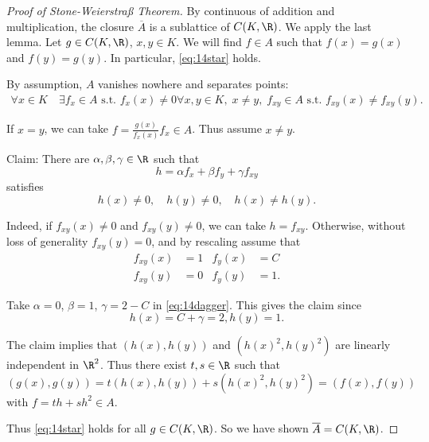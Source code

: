 \documentclass{article}
\begin{document}
\begin{proof}[Proof of Stone-Weierstra{\ss} Theorem]
    By continuous of addition and multiplication, the closure $\overline{A}$ is a sublattice of $C(K, \R)$.
    We apply the last lemma.
    Let $g \in C(K, \R)$, $x, y \in K$. We will find $f \in A$ such that $f(x) = g(x)$ and $f(y) = g(y)$.
    In particular, \eqref{eq:14star} holds.

    By assumption, $A$ vanishes nowhere and separates points:
    \begin{align*}
        \forall x \in K \quad \exists f_x \in A \text{ s.t. } f_x(x) \neq 0
        \forall x, y \in K, \; x \neq y, \; f_{xy} \in A \text{ s.t. } f_{xy}(x) \neq f_{xy}(y).
    \end{align*}

    If $x = y$, we can take $f = \frac{g(x)}{f_x(x)} f_x \in A$.
    Thus assume $x \neq y$.

    Claim: There are $\alpha, \beta, \gamma \in \R$ such that
    \begin{equation*}
        h = \alpha f_x + \beta f_y + \gamma f_{xy} \label{eq:14dagger} \tag{$\dagger$}
    \end{equation*}
    satisfies
    \begin{equation*}
        h(x) \neq 0, \quad h(y) \neq 0, \quad h(x) \neq h(y).
    \end{equation*}

    Indeed, if $f_{xy}(x) \neq 0$ and $f_{xy}(y) \neq 0$, we can take $h = f_{xy}$.
    Otherwise, without loss of generality $f_{xy}(y) = 0$, and by rescaling assume that
    \begin{align*}
        f_{xy}(x) &= 1 & f_y(x) &= C \\
        f_{xy}(y) &= 0 & f_y(y) &= 1.
    \end{align*}

    Take $\alpha = 0$, $\beta=1$, $\gamma=2-C$ in \eqref{eq:14dagger}.
    This gives the claim since
    \begin{equation*}
        h(x) = C + \gamma = 2, h(y) = 1.
    \end{equation*}

    The claim implies that $(h(x), h(y))$ and $(h(x)^2, h(y)^2)$ are linearly independent in $\R^2$.
    Thus there exist $t, s \in \R$ such that
    \begin{equation*}
        (g(x), g(y)) = t(h(x), h(y)) + s(h(x)^2, h(y)^2) = (f(x), f(y))
    \end{equation*}
    with $f = th + sh^2 \in A$.

    Thus \eqref{eq:14star} holds for all $g \in C(K, \R)$.
    So we have shown $\overline{A} = C(K, \R)$.
\end{proof}
\end{document}
